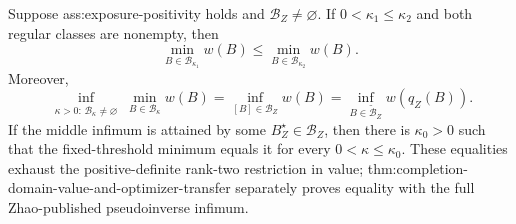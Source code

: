 Suppose ass:exposure-positivity holds and \(\mathcal B_Z\ne\varnothing\).  If \(0<\kappa_1\le\kappa_2\) and both regular classes are nonempty, then
\[
\min_{B\in\mathcal B_{\kappa_1}}w(B)
\le
\min_{B\in\mathcal B_{\kappa_2}}w(B).
\]
Moreover,
\[
\inf_{\substack{\kappa>0:\,\mathcal B_\kappa\ne\varnothing}}
\min_{B\in\mathcal B_\kappa}w(B)
=
\inf_{[B]\in\mathcal B_Z}w(B)
=
\inf_{B\in\widetilde{\mathcal B}_Z}w(q_Z(B)).
\]
If the middle infimum is attained by some \(B_Z^\star\in\mathcal B_Z\), then there is \(\kappa_0>0\) such that the fixed-threshold minimum equals it for every \(0<\kappa\le\kappa_0\).  These equalities exhaust the positive-definite rank-two restriction in value; thm:completion-domain-value-and-optimizer-transfer separately proves equality with the full Zhao-published pseudoinverse infimum.